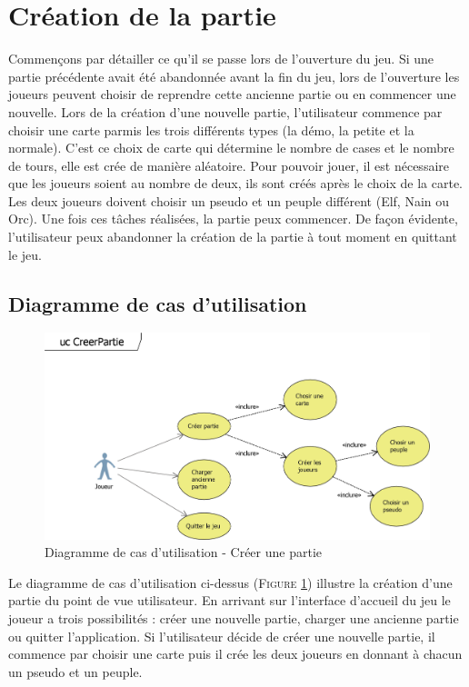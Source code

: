 \documentclass[a4paper,11pt]{article}
\begin{document}
\section{Création de la partie}
\vspace*{0.5cm}
Commençons par détailler ce qu'il se passe lors de l'ouverture du jeu. Si une partie précédente avait été abandonnée avant la fin du jeu, lors de l'ouverture les joueurs peuvent choisir de reprendre cette ancienne partie ou en commencer une nouvelle. Lors de la création d'une nouvelle partie, l'utilisateur commence par choisir une carte parmis les trois différents types (la démo, la petite et la normale). C'est ce choix de carte qui détermine le nombre de cases et le nombre de tours, elle est crée de manière aléatoire. Pour pouvoir jouer, il est nécessaire que les joueurs soient au nombre de deux, ils sont créés après le choix de la carte. Les deux joueurs doivent choisir un pseudo et un peuple différent (Elf, Nain ou Orc). Une fois ces tâches réalisées, la partie peux commencer. De façon évidente, l'utilisateur peux abandonner la création de la partie à tout moment en quittant le jeu. 
\vspace*{0.5cm}
\subsection{Diagramme de cas d'utilisation}
\vspace*{0.5cm}
\begin{figure}[h!]
\includegraphics{ucCreerPartie.png}
\caption{Diagramme de cas d'utilisation - Créer une partie}
\label{fig:uccreer}
\end{figure}
\vspace*{1cm}
Le diagramme de cas d'utilisation ci-dessus (\textsc{Figure \ref{fig:uccreer}}) illustre la création d'une partie du point de vue utilisateur. En arrivant sur l'interface d'accueil du jeu le joueur a trois possibilités : créer une nouvelle partie, charger une ancienne partie ou quitter l'application. Si l'utilisateur décide de créer une nouvelle partie, il commence par choisir une carte puis il crée les deux joueurs en donnant à chacun un pseudo et un peuple.
\newpage
\end{document}
